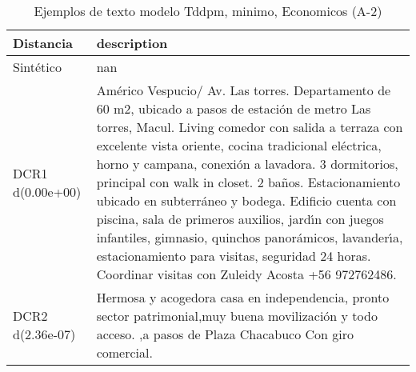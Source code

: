 \begin{table}[H]
\centering
\fontsize{10}{14}\selectfont
\caption{Ejemplos de texto modelo Tddpm, minimo, Economicos (A-2)}
\label{table-example-economicos-a-2-tddpm_mlp-min-text}
\begin{tabular}{|l|m{35em}|}
\hline
\rowcolor[gray]{0.8}
Distancia & description \\
\hline Sintético & nan \\
\hline DCR1 d(0.00e+00) & Am\'erico Vespucio/ Av. Las torres. Departamento de 60 m2, ubicado a pasos de estaci\'on de metro Las torres, Macul. Living comedor con salida a terraza con excelente vista oriente, cocina tradicional el\'ectrica, horno y campana, conexi\'on a lavadora. 3 dormitorios, principal con walk in closet. 2 ba\~nos. Estacionamiento ubicado en subterr\'aneo y bodega. Edificio cuenta con piscina, sala de primeros auxilios, jard{\'\i}n con juegos infantiles, gimnasio, quinchos panor\'amicos, lavander{\'\i}a, estacionamiento para visitas, seguridad 24 horas. Coordinar visitas con Zuleidy Acosta +56 972762486. \\
\hline DCR2 d(2.36e-07) & Hermosa y acogedora casa en independencia, pronto sector patrimonial,muy buena movilizaci\'on y todo acceso. ,a pasos de Plaza Chacabuco Con giro comercial. \\
\hline
\end{tabular}
\end{table}

